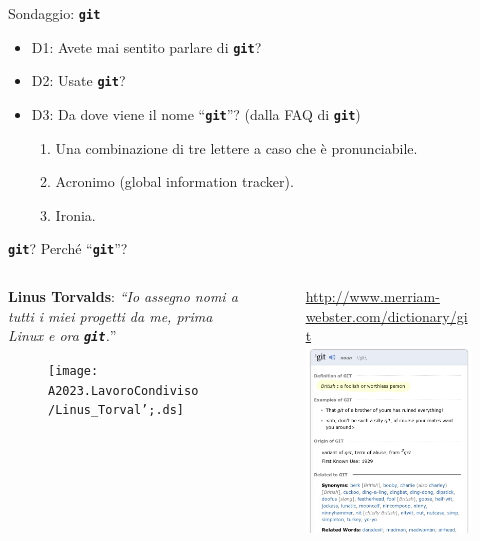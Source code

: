 \documentclass{beamer}
\newcommand{\git}{\texttt{\textbf{git}}\xspace}
\begin{document}
\begin{frame}{\centerline{Sondaggio: \git}}
  \begin{itemize}\setlength{\itemsep}{+3mm}
  \item D1: Avete mai sentito parlare di \git?
  \item D2: Usate \git?
  \item D3: Da dove viene il nome ``\git''? (dalla FAQ di \git)
    \begin{enumerate}\setlength{\itemsep}{+2mm}
    \item Una combinazione di tre lettere a caso che \`{e} pronunciabile.
    \item Acronimo (global information tracker).
    \item Ironia.
    \end{enumerate}
  \end{itemize}
\end{frame}

\begin{frame}{\centerline{\git? Perch\'{e} ``\git''?}}
  \begin{columns}
    \begin{column}{5cm}
      \textbf{Linus Torvalds}: 
        \emph{``Io assegno nomi a tutti i miei progetti da me, prima Linux e ora
        \git.}''
      \begin{figure}
        \centering
        \texttt{[image: A2023.LavoroCondiviso/Linus\_Torval';.ds]}
      \end{figure}
    \end{column}
    \begin{column}{7cm}
      \begin{figure}
        \url{http://www.merriam-webster.com/dictionary/git}
        \centering
        \includegraphics[width=5cm]{A2023.LavoroCondiviso/git-merriam}
      \end{figure}
    \end{column}
    \end{columns}
\end{frame}
\end{document}
